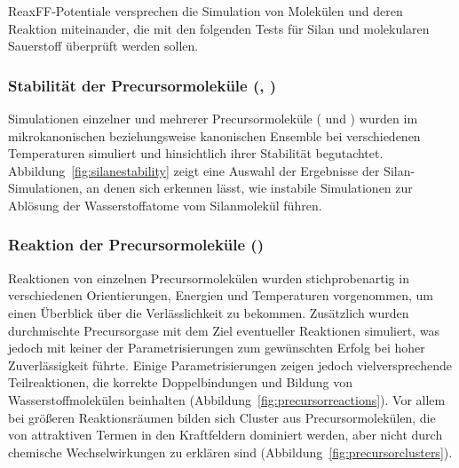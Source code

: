 ReaxFF-Potentiale versprechen die Simulation von Molekülen und deren Reaktion miteinander, die mit den folgenden Tests für Silan und molekularen Sauerstoff überprüft werden sollen.

\subsubsection{Stabilität der Precursormoleküle (, )}

Simulationen einzelner und mehrerer Precursormoleküle ( und ) wurden im mikrokanonischen beziehungsweise kanonischen Ensemble bei verschiedenen Temperaturen simuliert und hinsichtlich ihrer Stabilität begutachtet.
Abbildung~\ref{fig:silanestability} zeigt eine Auswahl der Ergebnisse der Silan-Simulationen, an denen sich erkennen lässt, wie instabile Simulationen zur Ablösung der Wasserstoffatome vom Silanmolekül führen.

\subsubsection{Reaktion der Precursormoleküle ()}

Reaktionen von einzelnen Precursormolekülen wurden stichprobenartig in verschiedenen Orientierungen, Energien und Temperaturen vorgenommen, um einen Überblick über die Verlässlichkeit zu bekommen.
Zusätzlich wurden durchmischte Precursorgase mit dem Ziel eventueller Reaktionen simuliert, was jedoch mit keiner der Parametrisierungen zum gewünschten Erfolg bei hoher Zuverlässigkeit führte.
Einige Parametrisierungen zeigen jedoch vielversprechende Teilreaktionen, die korrekte Doppelbindungen und Bildung von Wasserstoffmolekülen beinhalten (Abbildung~\ref{fig:precursorreactions}).
Vor allem bei größeren Reaktionsräumen bilden sich Cluster aus Precursormolekülen, die von attraktiven Termen in den Kraftfeldern dominiert werden, aber nicht durch chemische Wechselwirkungen zu erklären sind (Abbildung~\ref{fig:precursorclusters}).

